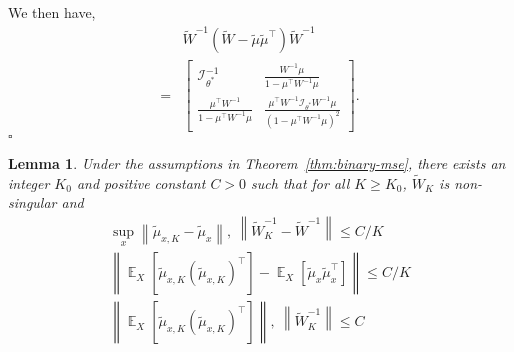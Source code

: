 \documentclass[11pt,a4paper]{article}
\newcommand{\qed}{\square}
\DeclareMathOperator{\E}{\mathbb{E}}
\newcommand{\wt}[1]{\widetilde{#1}}
\newcommand{\wbk}{\wt{W}_{K}}
\newcommand{\wb}{\wt{W}}
\newcommand{\mub}{\wt{\mu}}
\newcommand{\mubxk}{\wt{\mu}_{x, K}}
\newcommand{\mubx}{\wt{\mu}_{x}}
\newcommand{\vnorm}[1]{\left\| #1 \right\|}
\newcommand{\fisher}{\mathcal{I}_{\theta^*}}
\newtheorem{lemma}{Lemma}[section]
\begin{document}
We then have,
\begin{equation*}
\begin{aligned}
  & \wb^{-1}\left(\wb -  \mub\mub^\top \right)\wb^{-1} \\
= & \begin{bmatrix} \fisher ^{-1}& \frac{W^{-1}\mu}{1-\mu^{\top}W^{-1}\mu} \\ \frac{\mu^\top W^{-1}}{1-\mu^{\top}W^{-1}\mu}&  \frac{\mu^{\top}W^{-1}\fisher W^{-1}\mu}{(1-\mu^{\top}W^{-1}\mu)^2} \end{bmatrix}.
\end{aligned}
\end{equation*}
$\qed$

\begin{lemma}
Under the assumptions in Theorem~\ref{thm:binary-mse}, there exists an integer $K_0$ and positive constant $C>0$ such that for all $K\geq K_0$, $\wbk$ is non-singular and 
\begin{equation*}
\begin{gathered}
\sup_x\vnorm{\mubxk - \mubx}, ~\vnorm{\wbk^{-1} - \wb^{-1}} \leq C/K  \\
\vnorm{\E_X[\mubxk (\mubxk)^\top] - \E_X \left[\mubx\mubx^\top\right]} \leq C/K\\
\vnorm{\E_X[\mubxk (\mubxk)^\top]}, ~\vnorm{\wbk^{-1}} \leq C
\end{gathered}
\end{equation*}
\label{lem:w-mu-bound}
\end{lemma}
\end{document}
